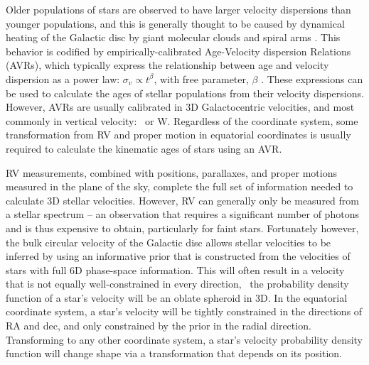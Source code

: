 Older populations of stars are observed to have larger velocity dispersions
than younger populations, and this is generally thought to be caused by
dynamical heating of the Galactic disc by giant molecular clouds and spiral
arms \citep[\eg][]{stromberg1946, wielen1977, nordstrom2004, holmberg2007,
holmberg2009, aumer2009, casagrande2011, yu2018, ting2019}.
This behavior is codified by empirically-calibrated Age-Velocity dispersion
Relations (AVRs), which typically express the relationship between age and
velocity dispersion as a power law: $\sigma_v \propto t^\beta$, with free
parameter, $\beta$ \citep[\eg][]{holmberg2009, yu2018, mackereth2019}.
These expressions can be used to calculate the ages of stellar populations
from their velocity dispersions.
However, AVRs are usually calibrated in 3D Galactocentric velocities, and most
commonly in vertical velocity: \vz\ or W.
Regardless of the coordinate system, some transformation from RV and proper
motion in equatorial coordinates is usually required to calculate the
kinematic ages of stars using an AVR.

RV measurements, combined with positions, parallaxes, and proper motions
measured in the plane of the sky, complete the full set of information needed
to calculate 3D stellar velocities.
However, RV can generally only be measured from a stellar spectrum -- an
observation that requires a significant number of photons and is thus
expensive to obtain, particularly for faint stars.
Fortunately however, the bulk circular velocity of the Galactic disc allows
stellar velocities to be inferred by using an informative prior that is
constructed from the velocities of stars with full 6D phase-space information.
This will often result in a velocity that is not equally well-constrained in
every direction, \ie\ the probability density function of a star's velocity
will be an oblate spheroid in 3D.
In the equatorial coordinate system, a star's velocity will be tightly
constrained in the directions of RA and dec, and only constrained by
the prior in the radial direction.
Transforming to any other coordinate system, a star's velocity probability
density function will change shape via a transformation that depends on its
position.

